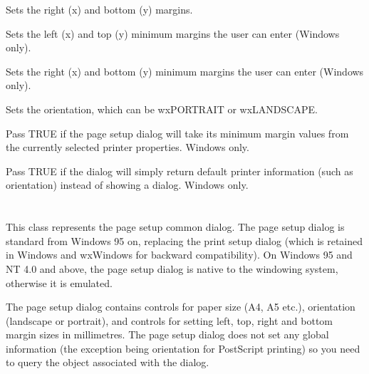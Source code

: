Sets the right (x) and bottom (y) margins.

\label{wxpagesetupdatasetminmargintopleft}


Sets the left (x) and top (y) minimum margins the user can enter (Windows only).

\label{wxpagesetupdatasetminmarginbottomright}


Sets the right (x) and bottom (y) minimum margins the user can enter (Windows only).

\label{wxpagesetupdatasetorientation}


Sets the orientation, which can be wxPORTRAIT or wxLANDSCAPE.

\label{wxpagesetupdatasetdefaultminmargins}


Pass TRUE if the page setup dialog will take its minimum margin values from the currently
selected printer properties. Windows only.

\label{wxpagesetupdatasetdefaultinfo}


Pass TRUE if the dialog will simply return default printer information (such as orientation)
instead of showing a dialog. Windows only.

\section{}\label{wxpagesetupdialog}

This class represents the page setup common dialog. The page setup dialog is standard from
Windows 95 on, replacing the print setup dialog (which is retained in Windows and wxWindows
for backward compatibility). On Windows 95 and NT 4.0 and above, the page setup dialog is
native to the windowing system, otherwise it is emulated.

The page setup dialog contains controls for paper size (A4, A5 etc.), orientation (landscape
or portrait), and controls for setting left, top, right and bottom margin sizes in millimetres.
The page setup dialog does not set any global information (the exception being orientation
for PostScript printing) so you need to query the  object
associated with the dialog.

